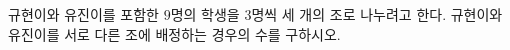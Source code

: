 \hspace*{2mm}\begin{minipage}[t]{\dimexpr\linewidth-2mm\relax}\vspace{0pt}
규현이와 유진이를 포함한 $9$명의 학생을 $3$명씩 세 개의 조로 나누려고 한다. 규현이와 유진이를 서로 다른 조에 배정하는 경우의 수를 구하시오.\end{minipage}
